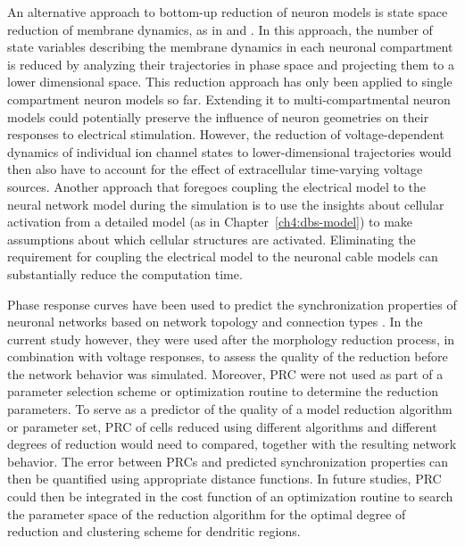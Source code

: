 %
%
An alternative approach to bottom-up reduction of neuron models is state space reduction
of membrane dynamics, as in \cite{fitzhugh_impulses_1961} and \cite{morris_voltage_1981}.
In this approach, the number of state variables describing the membrane dynamics in each
neuronal compartment is reduced by analyzing their trajectories in phase space %
and projecting them to a lower dimensional space. This reduction approach has only been
applied to single compartment neuron models so far. Extending it to multi-compartmental
neuron models could potentially preserve the influence of neuron geometries on their
responses to electrical stimulation. However, the reduction of voltage-dependent dynamics
of individual ion channel states to lower-dimensional trajectories would then also
have to account for the effect of extracellular time-varying voltage sources.
%
%
%
Another approach that foregoes coupling the electrical model to the neural network model
during the simulation is to use the insights about cellular activation from a detailed model
(as in Chapter~\ref{ch4:dbs-model}) to make assumptions about which cellular structures are activated.
%
Eliminating the requirement for coupling the electrical model to the neuronal cable models
can substantially reduce the computation time.


%
Phase response curves have been used to predict the synchronization properties
of neuronal networks based on network topology and connection types
\cite{achuthan_phase-resetting_2009,netoff_synchronization_2005,acker_synchronization_2003}.
In the current study however, they were used after the morphology reduction process, %
in combination with voltage responses, to assess the quality of the reduction
before the network behavior was simulated. Moreover, PRC were not used
as part of a parameter selection scheme or optimization routine to determine
the reduction parameters.
To serve as a predictor of the quality of a model reduction algorithm or parameter set, %
PRC of cells reduced using different algorithms and different degrees of reduction
would need to compared, together with the resulting network behavior.
The error between PRCs and predicted synchronization properties can then be quantified
using appropriate distance functions. In future studies, PRC could
then be integrated in the cost function of an optimization routine to search the
parameter space of the reduction algorithm for the optimal degree of reduction
and clustering scheme for dendritic regions.

